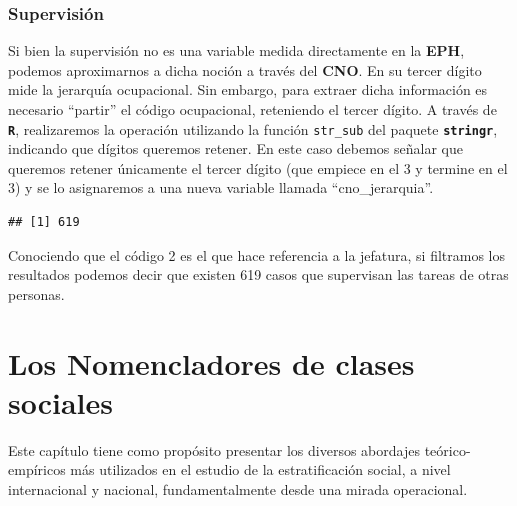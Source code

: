 \documentclass[
]{book}
\newenvironment{Shaded}{\begin{snugshade}}{\end{snugshade}}
\newcommand{\AttributeTok}[1]{\textcolor[rgb]{0.77,0.63,0.00}{#1}}
\newcommand{\DecValTok}[1]{\textcolor[rgb]{0.00,0.00,0.81}{#1}}
\newcommand{\FunctionTok}[1]{\textcolor[rgb]{0.00,0.00,0.00}{#1}}
\newcommand{\NormalTok}[1]{#1}
\newcommand{\OtherTok}[1]{\textcolor[rgb]{0.56,0.35,0.01}{#1}}
\newcommand{\SpecialCharTok}[1]{\textcolor[rgb]{0.00,0.00,0.00}{#1}}
\begin{document}
\hypertarget{supervisiuxf3n-1}{%
\subsection{Supervisión}\label{supervisiuxf3n-1}}

Si bien la supervisión no es una variable medida directamente en la \textbf{EPH}, podemos aproximarnos a dicha noción a través del \textbf{CNO}. En su tercer dígito mide la jerarquía ocupacional. Sin embargo, para extraer dicha información es necesario ``partir'' el código ocupacional, reteniendo el tercer dígito. A través de \textbf{\texttt{R}}, realizaremos la operación utilizando la función \texttt{str\_sub} del paquete \textbf{\texttt{stringr}}, indicando que dígitos queremos retener. En este caso debemos señalar que queremos retener únicamente el tercer dígito (que empiece en el 3 y termine en el 3) y se lo asignaremos a una nueva variable llamada ``cno\_jerarquia''.

\begin{Shaded}
\end{Shaded}

\begin{verbatim}
## [1] 619
\end{verbatim}

Conociendo que el código 2 es el que hace referencia a la jefatura, si filtramos los resultados podemos decir que existen 619 casos que supervisan las tareas de otras personas.

\hypertarget{clases5}{%
\chapter{Los Nomencladores de clases sociales}\label{clases5}}

Este capítulo tiene como propósito presentar los diversos abordajes teórico-empíricos más utilizados en el estudio de la estratificación social, a nivel internacional y nacional, fundamentalmente desde una mirada operacional.
\end{document}
